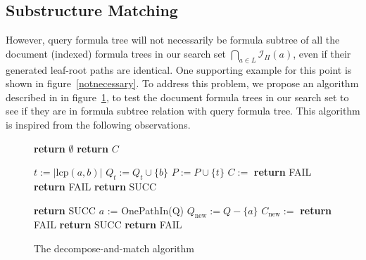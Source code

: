 \documentclass{acm_proc_article-sp}
\begin{document}
\subsection{Substructure Matching}
However, query formula tree will not necessarily be formula subtree of all the document (indexed) formula trees in our search set
$\bigcap_{a \in L} \mathcal{I}_{\Pi}(a)$,
even if their generated leaf-root paths are identical.
One supporting example for this point is shown in figure~\ref{notnecessary}.
To address this problem, we propose an algorithm described in in figure~\ref{submatchalgo}, to test the document formula trees in our search set to see if they are in formula subtree relation with query formula tree.
This algorithm is inspired from the following observations. 

\begin{figure}
\begin{algorithmic}[1]

\State \textbf{return} $\emptyset$
\Else
{}
\EndIf
\EndFor
\State \textbf{return} $C$
\EndProcedure

\State {}

\State $t := \big| \mathrm{lcp}(a,b) \big|$
\State $Q_t := Q_t \cup \{b\}$
\State $P := P \cup \{t\}$
\EndFor
{}
\State $C := $ 
\State \textbf{return} FAIL
\EndIf
\EndIf
\EndFor
\EndFor
{}
\State \textbf{return} FAIL
\EndIf
\EndFor
\State \textbf{return} SUCC
\EndProcedure

\State {}

 \textbf{return} SUCC
\EndIf
\State $a$ := OnePathIn(Q)
\State $Q_{\mathrm{new}} := Q - \{a\}$
\State $C_{\mathrm{new}} := $ 
 \textbf{return} FAIL
\EndIf
{}
\textbf{return} SUCC
\EndIf
\EndFor
\State \textbf{return} FAIL
\EndProcedure

\end{algorithmic}
\caption{The decompose-and-match algorithm}\label{submatchalgo}
\end{figure}
\end{document}
